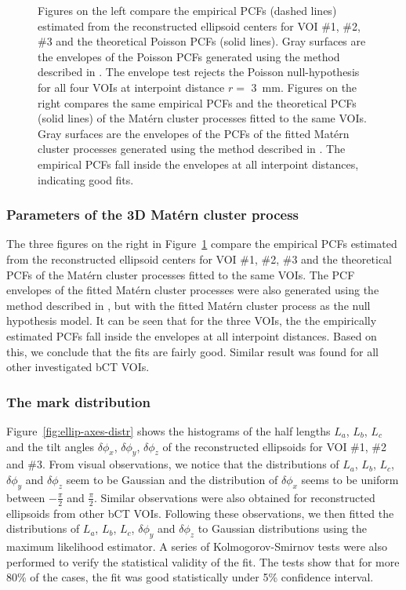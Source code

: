 \documentclass[journal]{IEEEtran}
\begin{document}
\begin{figure}[!htb]
  \caption{Figures on the left compare the empirical PCFs (dashed
    lines) estimated from the reconstructed ellipsoid centers for VOI
    \#1, \#2, \#3 and the theoretical Poisson PCFs (solid lines). Gray
    surfaces are the envelopes of the Poisson PCFs generated using the
    method described in \cite{baddeley2014tests}. The envelope test
    rejects the Poisson null-hypothesis for all four VOIs at
    interpoint distance $r = $ \SI{3}{\mm}. Figures on the right
    compares the same empirical PCFs and the theoretical PCFs (solid
    lines) of the Mat\'ern cluster processes fitted to the same
    VOIs. Gray surfaces are the envelopes of the PCFs of the fitted
    Mat\'ern cluster processes generated using the method described in
    \cite{baddeley2014tests}. The empirical PCFs fall inside the
    envelopes at all interpoint distances, indicating good fits.}
  \label{fig:pcf-est}

\end{figure}

\subsubsection{Parameters of the 3D Mat\'ern cluster process}
\label{sec:parameters-3d-matern}

The three figures on the right in Figure~\ref{fig:pcf-est} compare the
empirical PCFs estimated from the reconstructed ellipsoid centers for
VOI \#1, \#2, \#3 and the theoretical PCFs of the Mat\'ern cluster
processes fitted to the same VOIs. The PCF envelopes of the fitted
Mat\'ern cluster processes were also generated using the method
described in \cite{baddeley2014tests}, but with the fitted Mat\'ern
cluster process as the null hypothesis model. It can be seen that for
the three VOIs, the the empirically estimated PCFs fall inside the
envelopes at all interpoint distances. Based on this, we conclude that
the fits are fairly good. Similar result was found for all other
investigated bCT VOIs.

\subsubsection{The mark distribution}
\label{sec:mark-distribution-1}

Figure~\ref{fig:ellip-axes-distr} shows the histograms of the half
lengths $L_a$, $L_b$, $L_c$ and the tilt angles $\delta\phi_x$,
$\delta\phi_y$, $\delta\phi_z$ of the reconstructed ellipsoids for VOI
\#1, \#2 and \#3. From visual observations, we notice that the
distributions of $L_a$, $L_b$, $L_c$, $\delta\phi_y$ and
$\delta\phi_z$ seem to be Gaussian and the distribution of
$\delta\phi_x$ seems to be uniform between $-\frac{\pi}{2}$ and
$\frac{\pi}{2}$. Similar observations were also obtained for
reconstructed ellipsoids from other bCT VOIs. Following these
observations, we then fitted the distributions of $L_a$, $L_b$, $L_c$,
$\delta\phi_y$ and $\delta\phi_z$ to Gaussian distributions using the
maximum likelihood estimator. A series of Kolmogorov-Smirnov tests
were also performed to verify the statistical validity of the fit. The
tests show that for more 80\% of the cases, the fit was good
statistically under 5\% confidence interval.
\end{document}
